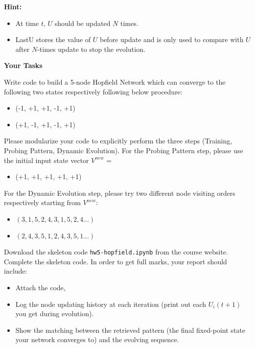 \documentclass{article}
\begin{document}
\begin{probset}
\begin{prob}
    \textbf{Hint:}
    \begin{itemize}
        \item At time $t$, $U$ should be updated $N$ times.
        \item LastU stores the value of $U$ before update and is only used to compare with $U$ after $N$-times update to stop the evolution.
    \end{itemize}

    \textbf{Your Tasks}

    Write code to build a 5-node Hopfield Network which can converge to the following two states respectively following below procedure:
    \begin{itemize}
        \item (-1, +1, +1, -1, +1)
        \item (+1, -1, +1, -1, +1)
    \end{itemize}
    
    Please modularize your code to explicitly perform the three steps (Training, Probing Pattern, Dynamic Evolution).
    For the Probing Pattern step, please use the initial input state vector $V^{new}$ = 
    \begin{itemize}
        \item (+1, +1, +1, +1, +1)
    \end{itemize}

    For the Dynamic Evolution step, please try two different node visiting orders respectively starting from $V^{new}$:
    \begin{itemize}
        \item $(3, 1, 5, 2, 4, 3, 1, 5, 2, 4...)$
        \item $(2, 4, 3, 5, 1, 2, 4, 3, 5, 1...)$
    \end{itemize}

    Download the skeleton code \texttt{hw5-hopfield.ipynb} from the course website. Complete the skeleton code. In order to get full marks, your report should include:

    \begin{itemize}
        \item Attach the code,
        \item Log the node updating history at each iteration (print out each $U_i(t+ 1)$ you get during evolution).
        \item Show the matching between the retrieved pattern (the final fixed-point state your network converges to) and the evolving sequence.
    \end{itemize}



\end{prob}
\end{probset}
\end{document}

